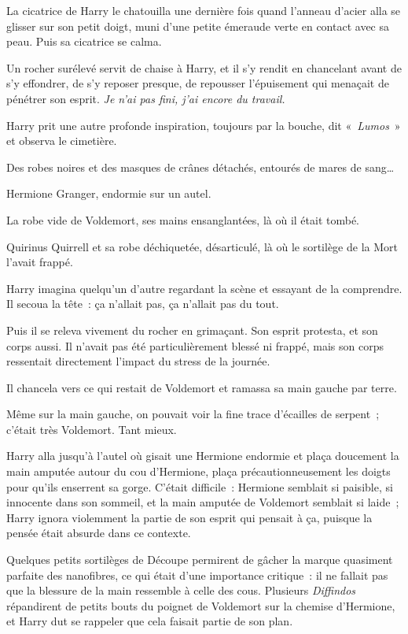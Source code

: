 La cicatrice de Harry le chatouilla une dernière fois quand l'anneau d'acier alla se glisser sur son petit doigt, muni d'une petite émeraude verte en contact avec sa peau. Puis sa cicatrice se calma.

Un rocher surélevé servit de chaise à Harry, et il s'y rendit en chancelant avant de s'y effondrer, de s'y reposer presque, de repousser l'épuisement qui menaçait de pénétrer son esprit. \emph{Je n'ai pas fini, j'ai encore du travail.}

Harry prit une autre profonde inspiration, toujours par la bouche, dit «~\emph{Lumos}~» et observa le cimetière.

Des robes noires et des masques de crânes détachés, entourés de mares de sang…

Hermione Granger, endormie sur un autel.

La robe vide de Voldemort, ses mains ensanglantées, là où il était tombé.

Quirinus Quirrell et sa robe déchiquetée, désarticulé, là où le sortilège de la Mort l'avait frappé.

Harry imagina quelqu'un d'autre regardant la scène et essayant de la comprendre. Il secoua la tête~: ça n'allait pas, ça n'allait pas du tout.

Puis il se releva vivement du rocher en grimaçant. Son esprit protesta, et son corps aussi. Il n'avait pas été particulièrement blessé ni frappé, mais son corps ressentait directement l'impact du stress de la journée.

Il chancela vers ce qui restait de Voldemort et ramassa sa main gauche par terre.

Même sur la main gauche, on pouvait voir la fine trace d'écailles de serpent~; c'était très Voldemort. Tant mieux.

Harry alla jusqu'à l'autel où gisait une Hermione endormie et plaça doucement la main amputée autour du cou d'Hermione, plaça précautionneusement les doigts pour qu'ils enserrent sa gorge. C'était difficile~: Hermione semblait si paisible, si innocente dans son sommeil, et la main amputée de Voldemort semblait si laide~; Harry ignora violemment la partie de son esprit qui pensait à ça, puisque la pensée était absurde dans ce contexte.

Quelques petits sortilèges de Découpe permirent de gâcher la marque quasiment parfaite des nanofibres, ce qui était d'une importance critique~: il ne fallait pas que la blessure de la main ressemble à celle des cous. Plusieurs \emph{Diffindos} répandirent de petits bouts du poignet de Voldemort sur la chemise d'Hermione, et Harry dut se rappeler que cela faisait partie de son plan.

